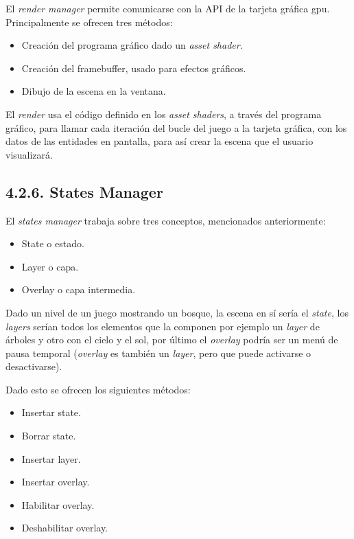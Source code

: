 El \textit{render manager} permite comunicarse con la API de la tarjeta gráfica \gls{gpu}.
Principalmente se ofrecen tres métodos:
\begin{itemize}
    \item Creación del programa gráfico dado un \textit{asset shader}.
    \item Creación del framebuffer, usado para efectos gráficos.
    \item Dibujo de la escena en la ventana.
\end{itemize}
El \textit{render} usa el código definido en los \textit{asset shaders}\cite{shaders-getting-started}, a través del programa gráfico,
para llamar cada iteración del bucle del juego a la tarjeta gráfica, con los datos de las 
entidades en pantalla, para así crear la escena que el usuario visualizará.

\subsection*{4.2.6. States Manager}\label{sec:workflow_managers_states}

El \textit{states manager} trabaja sobre tres conceptos, mencionados anteriormente:
\begin{itemize}
    \item State o estado.
    \item Layer o capa.
    \item Overlay o capa intermedia.
\end{itemize}
Dado un nivel de un juego mostrando un bosque, la escena en sí sería el \textit{state}, los \textit{layers} serían todos los elementos que la componen
por ejemplo un \textit{layer} de árboles y otro con el cielo y el sol, por último el \textit{overlay} podría ser un menú de pausa
temporal (\textit{overlay} es también un \textit{layer}, pero que puede activarse o desactivarse).

Dado esto se ofrecen los siguientes métodos:
\begin{itemize}
    \item Insertar state.
    \item Borrar state.
    \item Insertar layer.
    \item Insertar overlay.
    \item Habilitar overlay.
    \item Deshabilitar overlay.
\end{itemize}

